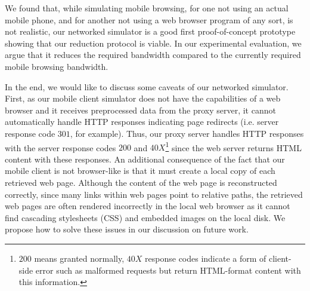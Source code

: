 We found that, while simulating mobile browsing, for one not using an actual mobile phone, and for 
another not using a web browser program of any sort, is not realistic, our networked simulator is a 
good first proof-of-concept prototype showing that our reduction protocol is viable. In our 
experimental evaluation, we argue that it reduces the required bandwidth compared to the currently 
required mobile browsing bandwidth.

In the end, we would like to discuss some caveats of our networked simulator. First, as our mobile 
client simulator does not have the capabilities of a web browser and it receives preprocessed data 
from the proxy server, it cannot automatically handle HTTP responses indicating page redirects (i.e. 
server response code $301$, for example). Thus, our proxy server handles HTTP responses with the 
server response codes $200$ and $40X$\footnote{$200$ means granted normally, $40X$ response codes 
indicate a form of client-side error such as malformed requests but return HTML-format content with 
this information.} since the web server returns HTML content with these responses. An additional 
consequence of the fact that our mobile client is not browser-like is that it must create a local copy 
of each retrieved web page. Although the content of the web page is reconstructed correctly, since 
many links within web pages point to relative paths, the retrieved web pages are often rendered 
incorrectly in the local web browser as it cannot find cascading stylesheets (CSS) and embedded images 
on the local disk. We propose how to solve these issues in our discussion on future work.